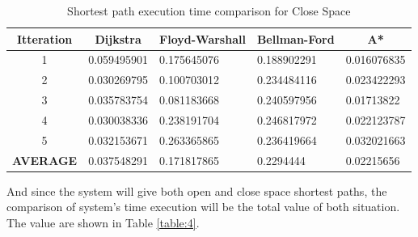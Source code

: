 \begin{table}[h!]
	\centering
	\caption{Shortest path execution time comparison for Close Space}
	\label{table:3}
	\begin{tabular}{|c|l|l|l|l|}
		\hline
		\textbf{Itteration}                                            & \multicolumn{1}{c|}{\textbf{Dijkstra}} & \multicolumn{1}{c|}{\textbf{Floyd-Warshall}} & \multicolumn{1}{c|}{\textbf{Bellman-Ford}} & \multicolumn{1}{c|}{\textbf{A*}} \\ \hline
		1                                                              & 0.059495901                            & 0.175645076                                  & 0.188902291                                & 0.016076835                      \\ \hline
		2                                                              & 0.030269795                            & 0.100703012                                  & 0.234484116                                & 0.023422293                      \\ \hline
		3                                                              & 0.035783754                            & 0.081183668                                  & 0.240597956                                & 0.01713822                       \\ \hline
		4                                                              & 0.030038336                            & 0.238191704                                  & 0.246817972                                & 0.022123787                      \\ \hline
		5                                                              & 0.032153671                            & 0.263365865                                  & 0.236419664                                & 0.032021663                      \\ \hline
		\rowcolor[HTML]{9B9B9B} 
		\multicolumn{1}{|l|}
		{\cellcolor[HTML]{9B9B9B}\textbf{AVERAGE}} & 0.037548291                            & 0.171817865                                  & 0.2294444                                  & 0.02215656                       \\ \hline
	\end{tabular}
\end{table}
\vspace{8mm}
And since the system will give both open and close space shortest paths, the comparison of system's time execution will be the total value of both situation. The value are shown in Table \ref{table:4}.

